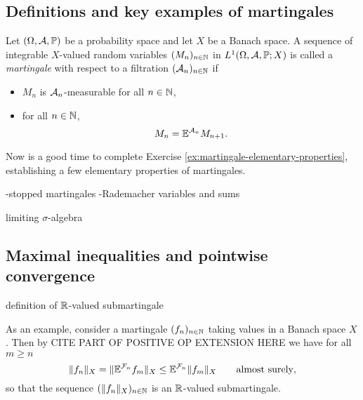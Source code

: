 

\subsection{Definitions and key examples of martingales}

\begin{defn}
  Let $(\Omega, \mathcal{A}, \mathbb{P})$ be a probability space and let $X$ be a Banach space.
  A sequence of integrable $X$-valued random variables $(M_n)_{n \in \mathbb{N}}$ in $L^1(\Omega, \mathcal{A}, \mathbb{P}; X)$ is called a \emph{martingale} with respect to a filtration $(\mathcal{A}_n)_{n \in \mathbb{N}}$ if
  \begin{itemize}
  \item $M_n$ is $\mathcal{A}_n$-measurable for all $n \in \mathbb{N}$,
  \item for all $n \in \mathbb{N}$,
    \begin{equation}\label{eq:mgale-defining-property}
      M_n = \mathbb{E}^{\mathcal{A}_n} M_{n+1}.
    \end{equation}
  \end{itemize}
\end{defn}

\begin{rmk}
  Now is a good time to complete Exercise \ref{ex:martingale-elementary-properties}, establishing a few elementary properties of martingales.
\end{rmk}

-stopped martingales
-Rademacher variables and sums

\begin{defn}
  limiting $\sigma$-algebra 
\end{defn}

\begin{thm}
  
\end{thm}

\subsection{Maximal inequalities and pointwise convergence}


\begin{defn}
  definition of $\mathbb{R}$-valued submartingale
\end{defn}

As an example, consider a martingale $(f_n)_{n \in \mathbb{N}}$ taking values in a Banach space $X$.
Then by {\color{red} CITE PART OF POSITIVE OP EXTENSION HERE} we have for all $m \geq n$
\begin{equation*}
  \|f_n\|_X = \|\mathbb{E}^{\mathcal{F}_n} f_m\|_X \leq \mathbb{E}^{\mathcal{F}_n} \|f_m\|_X \qquad \text{almost surely},
\end{equation*}
so that the sequence $(\|f_n\|_X)_{n \in \mathbb{N}}$ is an $\mathbb{R}$-valued submartingale.

